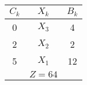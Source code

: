 \begin{tabular}{ccc}
\hline
\hline
$C_k$  & $X_k$  & $B_k$ \bigstrut\\
\hline
0      & $X_3$  & 4 \bigstrut[t]\\
2      & $X_2$  & 2 \\
5      & $X_1$  & 12 \bigstrut[b]\\
\hline
       & $Z=64$ &  \bigstrut\\
\hline
\hline
\end{tabular}%
